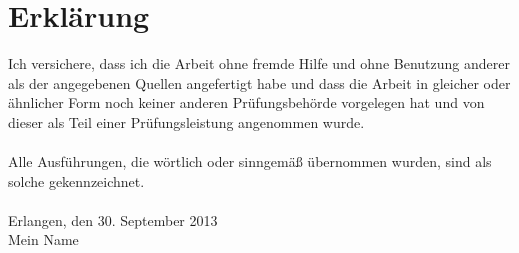 
\chapter*{Erklärung}
\label{sec:Erklärung}
Ich versichere, dass ich die Arbeit ohne fremde Hilfe und ohne Benutzung anderer als der angegebenen Quellen angefertigt habe und dass die Arbeit in gleicher oder ähnlicher Form noch keiner anderen Prüfungsbehörde vorgelegen hat und von dieser als Teil einer Prüfungsleistung angenommen wurde. \\
\\
Alle Ausführungen, die wörtlich oder sinngemäß übernommen wurden, sind als solche gekennzeichnet. \\
\vspace{1.0cm}
\\
Erlangen, den 30. September 2013
\vspace{2.5cm}
\\
Mein Name

